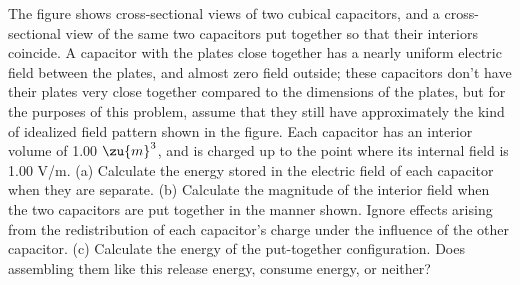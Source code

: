 The figure shows cross-sectional views of two cubical
        capacitors, and a cross-sectional view of the same two
        capacitors put together so that their interiors coincide. A
        capacitor with the plates close together has a nearly
        uniform electric field between the plates, and almost zero
        field outside; these capacitors don't have their plates very
        close together compared to the dimensions of the plates, but
        for the purposes of this problem, assume that they still
        have approximately the kind of idealized field pattern shown
        in the figure. Each capacitor has an interior volume of 1.00
        $\zu{m}^3$, and is charged up to the point where its internal
        field is 1.00 V/m. \hwendpart
        (a) Calculate the energy stored in the
        electric field of each capacitor when they are separate. \answercheck\hwendpart
        (b) Calculate the magnitude of the interior field when the two
        capacitors are put together in the manner shown. Ignore
        effects arising from the redistribution of each capacitor's
        charge under the influence of the other capacitor.\answercheck\hwendpart
        (c) Calculate the energy of the put-together configuration. Does
        assembling them like this release energy, consume energy, or neither?\answercheck
